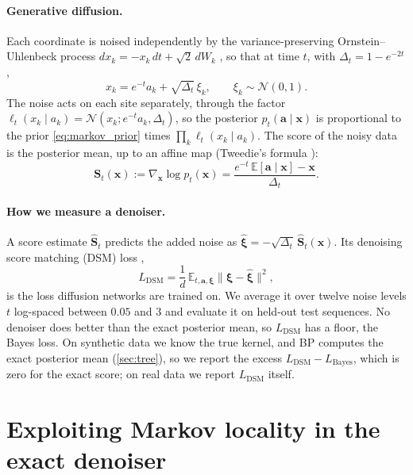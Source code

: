 \documentclass{article}
\begin{document}
\paragraph{Generative diffusion.}
Each coordinate is noised independently by the variance-preserving Ornstein--Uhlenbeck process
$dx_k=-x_k\,dt+\sqrt2\,dW_k$ \cite{song2021scorebased}, so that at time $t$, with $\Delta_t=1-e^{-2t}$,
\begin{equation}
x_k=e^{-t}a_k+\sqrt{\Delta_t}\,\xi_k,\qquad \xi_k\sim\mathcal{N}(0,1).
\label{eq:ou_corruption}
\end{equation}
The noise acts on each site separately, through the factor $\ell_t(x_k\mid a_k)=\mathcal{N}(x_k;e^{-t}a_k,\Delta_t)$,
so the posterior $p_t(\mathbf a\mid\mathbf x)$ is proportional to the prior \cref{eq:markov_prior} times
$\prod_k\ell_t(x_k\mid a_k)$. The score of the noisy data is the posterior mean, up to an affine map (Tweedie's formula
\cite{robbins1956empirical,efron2011tweedie}):
\begin{equation}
    \mathbf S_t(\mathbf x):=\nabla_{\mathbf x}\log p_t(\mathbf x)
    =\frac{e^{-t}\,\mathbb E[\mathbf a\mid\mathbf x]-\mathbf x}{\Delta_t}.
    \label{eq:tweedie}
\end{equation}

\paragraph{How we measure a denoiser.}
A score estimate $\widehat{\mathbf S}_t$ predicts the added noise as $\widehat{\boldsymbol\xi}=-\sqrt{\Delta_t}\,
\widehat{\mathbf S}_t(\mathbf x)$. Its denoising score matching (DSM) loss \cite{hyvarinen2005estimation,vincent2011connection,ho2020denoising},
\begin{equation}
    L_{\mathrm{DSM}}=\frac1d\,\mathbb E_{t,\mathbf a,\boldsymbol\xi}\big\|\boldsymbol\xi-\widehat{\boldsymbol\xi}\big\|^2,
    \label{eq:dsm}
\end{equation}
is the loss diffusion networks are trained on. We average it over twelve noise levels $t$ log-spaced between $0.05$
and $3$ and evaluate it on held-out test sequences. No denoiser does better than the exact posterior mean, so
$L_{\mathrm{DSM}}$ has a floor, the Bayes loss. On synthetic data we know the true kernel, and BP computes the exact
posterior mean (\cref{sec:tree}), so we report the excess $L_{\mathrm{DSM}}-L_{\mathrm{Bayes}}$, which is zero for
the exact score; on real data we report $L_{\mathrm{DSM}}$ itself.

\section{Exploiting Markov locality in the exact denoiser}
\label{sec:exact}
\end{document}
